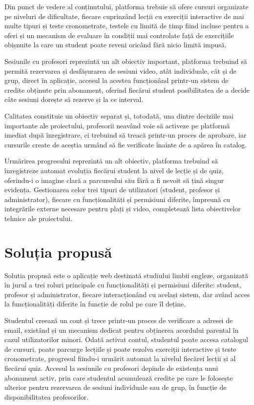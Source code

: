 Din punct de vedere al conținutului, platforma trebuie să ofere cursuri organizate pe niveluri de dificultate, fiecare cuprinzând lecții cu exerciții interactive de mai multe tipuri și teste cronometrate, testele cu limită de timp fiind incluse pentru a oferi și un mecanism de evaluare în condiții mai controlate față de exercițiile obișnuite la care un student poate reveni oricând fără nicio limită impusă.

Sesiunile cu profesori reprezintă un alt obiectiv important, platforma trebuind să permită rezervarea și desfășurarea de sesiuni video, atât individuale, cât și de grup, direct în aplicație, accesul la acestea funcționând printr-un sistem de credite obținute prin abonament, oferind fiecărui student posibilitatea de a decide câte sesiuni dorește să rezerve și la ce interval.

Calitatea constituie un obiectiv separat și, totodată, una dintre deciziile mai importante ale proiectului, profesorii neavând voie să activeze pe platformă imediat după înregistrare, ci trebuind să treacă printr-un proces de aprobare, iar cursurile create de aceștia urmând să fie verificate înainte de a apărea în catalog.

Urmărirea progresului reprezintă un alt obiectiv, platforma trebuind să înregistreze automat evoluția fiecărui student la nivel de lecție și de quiz, oferindu-i o imagine clară a parcursului său fără a fi nevoit să țină singur evidența. Gestionarea celor trei tipuri de utilizatori (student, profesor și administrator), fiecare cu funcționalități și permisiuni diferite, împreună cu integrările externe necesare pentru plați și video, completează lista obiectivelor tehnice ale proiectului.

\section{Soluția propusă}
Solutia propusă este o aplicație web destinată studiului limbii engleze, organizată în jurul a trei roluri principale cu funcționalități și permisiuni diferite: student, profesor și administrator, fiecare interacționând cu același sistem, dar având acces la funcționalități diferite în funcție de rolul pe care îl deține.

Studentul creează un cont și trece printr-un proces de verificare a adresei de email, existând și un mecanism dedicat pentru obținerea acordului parental în cazul utilizatorilor minori. Odată activat contul, studentul poate accesa catalogul de cursuri, poate parcurge lecțiile și poate rezolva exerciții interactive și teste cronometrate, progresul fiindu-i urmărit automat la nivelul fiecărei lecții și al fiecărui quiz. Accesul la sesiunile cu profesori depinde de existența unui abonament activ, prin care studentul acumulează credite pe care le folosește ulterior pentru rezervarea de sesiuni individuale sau de grup, în funcție de disponibilitatea profesorilor.

